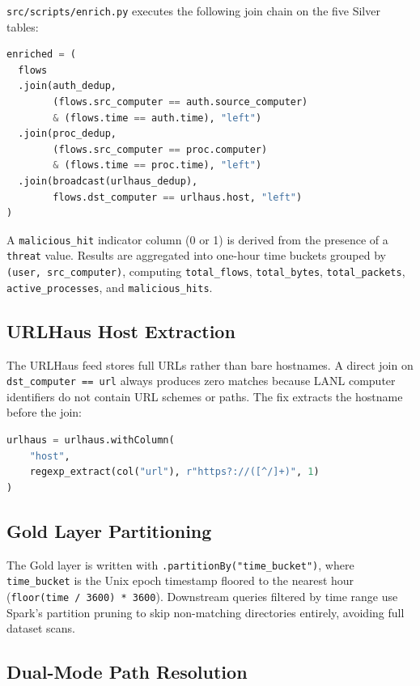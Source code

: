 \documentclass[conference]{IEEEtran}
\begin{document}
\texttt{src/scripts/enrich.py} executes the following join chain on the five Silver tables:

\begin{lstlisting}[language=Python, caption={Gold enrichment join chain.}]
enriched = (
  flows
  .join(auth_dedup,
        (flows.src_computer == auth.source_computer)
        & (flows.time == auth.time), "left")
  .join(proc_dedup,
        (flows.src_computer == proc.computer)
        & (flows.time == proc.time), "left")
  .join(broadcast(urlhaus_dedup),
        flows.dst_computer == urlhaus.host, "left")
)
\end{lstlisting}

A \texttt{malicious\_hit} indicator column (0 or 1) is derived from the presence of a \texttt{threat} value. Results are aggregated into one-hour time buckets grouped by \texttt{(user, src\_computer)}, computing \texttt{total\_flows}, \texttt{total\_bytes}, \texttt{total\_packets}, \texttt{active\_processes}, and \texttt{malicious\_hits}.

\subsection{URLHaus Host Extraction}

The URLHaus feed stores full URLs rather than bare hostnames. A direct join on \texttt{dst\_computer == url} always produces zero matches because LANL computer identifiers do not contain URL schemes or paths. The fix extracts the hostname before the join:

\begin{lstlisting}[language=Python, caption={Hostname extraction from URLHaus URLs.}]
urlhaus = urlhaus.withColumn(
    "host",
    regexp_extract(col("url"), r"https?://([^/]+)", 1)
)
\end{lstlisting}

\subsection{Gold Layer Partitioning}

The Gold layer is written with \texttt{.partitionBy("time\_bucket")}, where \texttt{time\_bucket} is the Unix epoch timestamp floored to the nearest hour (\texttt{floor(time / 3600) * 3600}). Downstream queries filtered by time range use Spark's partition pruning to skip non-matching directories entirely, avoiding full dataset scans.

\subsection{Dual-Mode Path Resolution}
\end{document}

